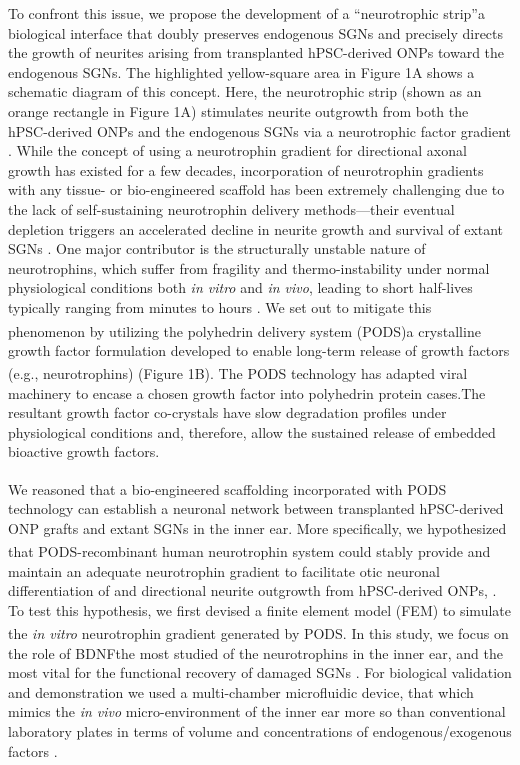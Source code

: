 \documentclass[review]{elsarticle}
\begin{document}
\indent To confront this issue, we propose the development of a “neurotrophic strip”\textemdash a biological interface that doubly preserves endogenous SGNs and precisely directs the growth of neurites arising from transplanted hPSC-derived ONPs toward the endogenous SGNs. The highlighted yellow-square area in Figure 1A shows a schematic diagram of this concept. Here, the neurotrophic strip (shown as an orange rectangle in Figure 1A) stimulates neurite outgrowth from both the hPSC-derived ONPs and the endogenous SGNs via a neurotrophic factor gradient \cite{Goodhill1998}. While the concept of using a neurotrophin gradient for directional axonal growth has existed for a few decades, incorporation of neurotrophin gradients with any tissue- or bio-engineered scaffold has been extremely challenging due to the lack of self-sustaining neurotrophin delivery methods—their eventual depletion triggers an accelerated decline in neurite growth and survival of extant SGNs \cite{Gillespie2003, Pettingill2008, Shepherd2009}. One major contributor is the structurally unstable nature of neurotrophins, which suffer from fragility and thermo-instability under normal physiological conditions both \textit{in vitro} and \textit{in vivo}, leading to short half-lives typically ranging from minutes to hours \cite{Baseri2012}. We set out to mitigate this phenomenon by utilizing the polyhedrin delivery system (PODS\textsuperscript{\textregistered})\textemdash a crystalline growth factor formulation developed to enable long-term release of growth factors (e.g., neurotrophins) \cite{Ikeda2001a,Suzuki1997,Mori1993} (Figure 1B). The PODS\textsuperscript{\textregistered} technology has adapted viral machinery to encase a chosen growth factor into polyhedrin protein cases.The resultant growth factor co-crystals have slow degradation profiles under physiological conditions and, therefore, allow the sustained release of embedded bioactive growth factors.  

\indent We reasoned that a bio-engineered scaffolding incorporated with PODS\textsuperscript{\textregistered} technology can establish a neuronal network between transplanted hPSC-derived ONP grafts and extant SGNs in the inner ear. More specifically, we hypothesized that PODS\textsuperscript{\textregistered}-recombinant human neurotrophin system could stably provide and maintain an adequate neurotrophin gradient to facilitate otic neuronal differentiation of and directional neurite outgrowth from hPSC-derived ONPs, . To test this hypothesis, we first devised a finite element model (FEM) to simulate the \textit{in vitro} neurotrophin gradient generated by PODS\textsuperscript{\textregistered}. In this study, we focus on the role of BDNF\textemdash the most studied of the neurotrophins in the inner ear, and the most vital for the functional recovery of damaged SGNs \cite{green2012}. For biological validation and demonstration we used a multi-chamber microfluidic device, that which mimics the \textit{in vivo} micro-environment of the inner ear more so than conventional laboratory plates in terms of volume and concentrations of endogenous/exogenous factors \cite{Meyvantsson2008}. 
\end{document}
